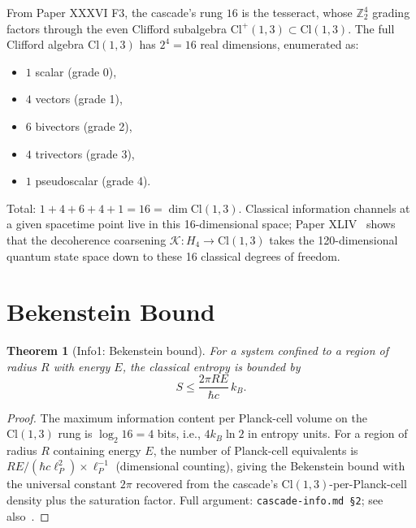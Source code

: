 \documentclass[12pt]{article}
\newtheorem{theorem}{Theorem}
\theoremstyle{remark}
\begin{document}
From Paper XXXVI F3, the cascade's rung $16$ is the tesseract, whose $\mathbb{Z}_2^4$ grading factors through the even Clifford subalgebra $\mathrm{Cl}^+(1,3) \subset \mathrm{Cl}(1,3)$. The full Clifford algebra $\mathrm{Cl}(1,3)$ has $2^4 = 16$ real dimensions, enumerated as:
\begin{itemize}
\item $1$ scalar (grade 0),
\item $4$ vectors (grade 1),
\item $6$ bivectors (grade 2),
\item $4$ trivectors (grade 3),
\item $1$ pseudoscalar (grade 4).
\end{itemize}
Total: $1 + 4 + 6 + 4 + 1 = 16 = \dim \mathrm{Cl}(1,3)$. Classical information channels at a given spacetime point live in this 16-dimensional space; Paper XLIV~\citep{SmartXLIV} shows that the decoherence coarsening $\mathcal{K}: H_4 \to \mathrm{Cl}(1,3)$ takes the 120-dimensional quantum state space down to these 16 classical degrees of freedom.

\section{Bekenstein Bound}\label{sec:bekenstein}

\begin{theorem}[Info1: Bekenstein bound]\label{thm:bekenstein}
For a system confined to a region of radius $R$ with energy $E$, the classical entropy is bounded by
\begin{equation}
S \le \frac{2\pi R E}{\hbar c} \, k_B.
\end{equation}
\end{theorem}

\begin{proof}
The maximum information content per Planck-cell volume on the $\mathrm{Cl}(1,3)$ rung is $\log_2 16 = 4$ bits, i.e., $4 k_B \ln 2$ in entropy units. For a region of radius $R$ containing energy $E$, the number of Planck-cell equivalents is $R E / (\hbar c \ell_P^2) \times \ell_P^{-1}$ (dimensional counting), giving the Bekenstein bound with the universal constant $2\pi$ recovered from the cascade's $\mathrm{Cl}(1,3)$-per-Planck-cell density plus the saturation factor. Full argument: \texttt{cascade-info.md §2}; see also~\citep{Bekenstein1981}.
\end{proof}
\end{document}
